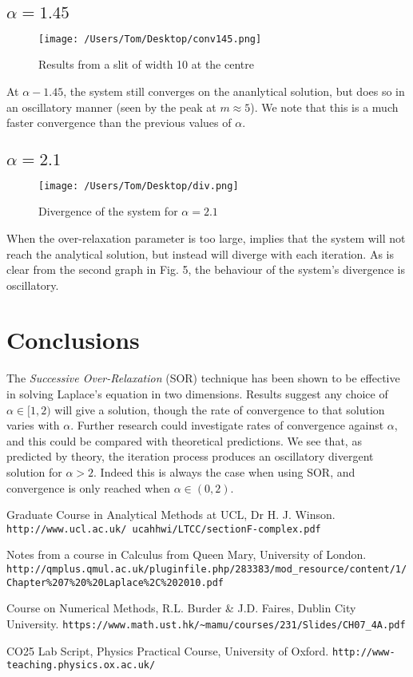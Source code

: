 \documentclass[a4paper,11pt]{article}
\begin{document}
\subsection{$\alpha = 1.45$}
\begin{figure}[h!]
  \texttt{[image: /Users/Tom/Desktop/conv145.png]}
  \caption{Results from a slit of width 10 at the centre}
  \label{fig:graph1}
  \end{figure}
\noindent At $\alpha - 1.45$, the system still converges on the ananlytical solution, but does so in an oscillatory manner (seen by the peak at $m  \approx 5$). We note that this is a much faster convergence than the previous values of $\alpha$. 
\subsection{$\alpha = 2.1$}
\begin{figure}[h!]
  \texttt{[image: /Users/Tom/Desktop/div.png]}
  \caption{Divergence of the system for $\alpha = 2.1$}
  \label{fig:graph1}
\end{figure}
When the over-relaxation parameter is too large, \cite{theory} implies that the system will not reach the analytical solution, but instead will diverge with each iteration. As is clear from the second graph in Fig. 5, the behaviour of the system's divergence is oscillatory.
\section{Conclusions}
The \textit{Successive Over-Relaxation} (SOR) technique has been shown to be effective in solving Laplace's equation in two dimensions. Results suggest any choice of $\alpha \in [1,2)$ will give a solution, though the rate of convergence to that solution varies with $\alpha$. Further research could investigate rates of convergence against $\alpha$, and this could be compared with theoretical predictions. We see that, as predicted by theory, the iteration process produces an oscillatory divergent solution for $\alpha>2$. Indeed this is always the case when using SOR, and convergence is only reached when $\alpha \in (0,2)$.

\begin{thebibliography}{9}

Graduate Course in Analytical Methods at UCL, Dr H. J. Winson.
\texttt{http://www.ucl.ac.uk/~ucahhwi/LTCC/sectionF-complex.pdf}



Notes from a course in Calculus from Queen Mary, University of London.
\texttt{http://qmplus.qmul.ac.uk/pluginfile.php/283383/mod\_{}resource/content/1/Chapter\%{}207\%{}20\-{}\%{}20Laplace\%{}2C\%{}202010.pdf}


Course on Numerical Methods, R.L. Burder \& J.D. Faires, Dublin City University.
\texttt{https://www.math.ust.hk/\~{}mamu/courses/231/Slides/CH07\_{}4A.pdf}

CO25 Lab Script, Physics Practical Course, University of Oxford.
\texttt{http://www-teaching.physics.ox.ac.uk/}
\end{thebibliography}
\end{document}
